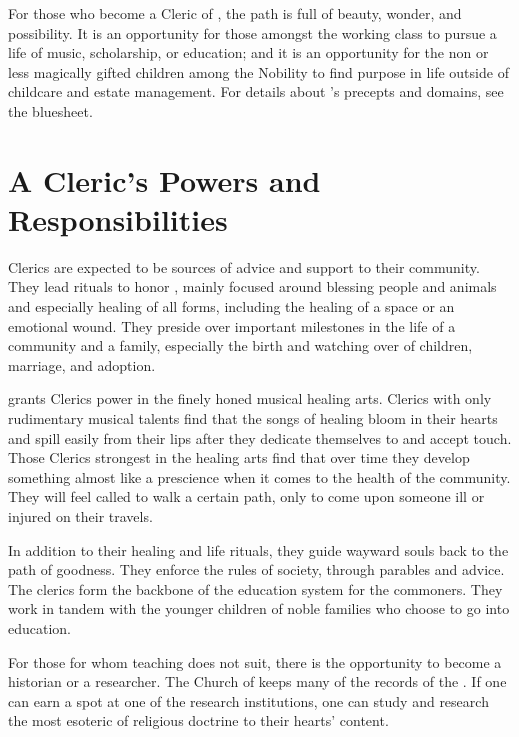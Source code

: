 \documentclass[blue]{GL2020}
\begin{document}
\name{\bCoSCleric{}}

For those who become a Cleric of \cFarmGod{}, the path is full of beauty, wonder, and possibility. It is an opportunity for those amongst the working class to pursue a life of music, scholarship, or education; and it is an opportunity for the non or less magically gifted children among the Nobility to find purpose in life outside of childcare and estate management. For details about \cFarmGod{}'s precepts and domains, see the \pFarm{} bluesheet.

\section*{A Cleric's Powers and Responsibilities}
Clerics are expected to be sources of advice and support to their community. They lead rituals to honor \cFarmGod{}, mainly focused around blessing people and animals and especially healing of all forms, including the healing of a space or an emotional wound. They preside over important milestones in the life of a community and a family, especially the birth and watching over of children, marriage, and adoption. 

\cFarmGod{} grants \cFarmGod{\their} Clerics power in the finely honed musical healing arts. \pFarm{} Clerics with only rudimentary musical talents find that the songs of healing bloom in their hearts and spill easily from their lips after they dedicate themselves to \cFarmGod{} and accept \cFarmGod{\their} touch. Those Clerics strongest in the healing arts find that over time they develop something almost like a prescience when it comes to the health of the community. They will feel called to walk a certain path, only to come upon someone ill or injured on their travels.

In addition to their healing and life rituals, they guide wayward souls back to the path of goodness. They enforce the rules of society, through parables and advice. The clerics form the backbone of the \pFarm{} education system for the commoners. They work in tandem with the younger children of noble families who choose to go into education. 

For those for whom teaching does not suit, there is the opportunity to become a historian or a researcher. The Church of \cFarmGod{} keeps many of the records of the \pFarm{}. If one can earn a spot at one of the research institutions, one can study and research the most esoteric of religious doctrine to their hearts’ content. 
\end{document}
